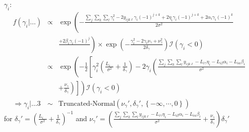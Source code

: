 $\gamma_i$:\\
\begin{eqnarray*}
f(\gamma_i|\dots)&\propto&\exp\left(-\frac{\sum_j\sum_k\sum_l\gamma_i^2-2y_{ijk\ell}\gamma_i(-1)^{j+k}+2\eta_i\gamma_i(-1)^{j+k}+2\alpha_i\gamma_i(-1)^k}{2\sigma^2}\right.\\
&&\left.\frac{+2\beta_i\gamma_i(-1)^j}{}\right)\times\exp\left(-\frac{\gamma_i^2-2\gamma_i\nu_{\gamma}+\nu_{\gamma}^2}{2\delta_{\gamma}}\right)\mathcal{I}\left(\gamma_i<0\right)\\
&\propto&\exp\left(-\frac{1}{2}\left[\gamma_i^{2}\left(\frac{L_{i\cdot\cdot}}{\sigma^2}+\frac{1}{\delta_{\gamma}}\right)-2\gamma_i\left(\frac{\sum_j\sum_k\sum_ly_{ijk\ell}-L_{i\gamma}\eta_i-L_{i\beta}\alpha_i-L_{i\alpha}\beta_i}{\sigma^2}\right.\right.\right.\\
&&\left.\left.\left.+\frac{\nu_{\gamma}}{\delta_{\gamma}}\right)\right]\right)\mathcal{I}\left(\gamma_i<0\right)\\
\Rightarrow\gamma_i|\dots3&\sim&\mbox{Truncated-Normal}\left(\nu_{\gamma}',\delta_{\gamma}',\left\{-\infty,\cdots,0\right\}\right)
\end{eqnarray*}
for $\displaystyle{\delta_{\gamma}' = \left(\frac{L_{i\cdot\cdot}}{\sigma^2}+\frac{1}{\delta_{\gamma}}\right)^{-1}}$ and $\displaystyle{\nu_{\gamma}' = \left(\frac{\sum_j\sum_k\sum_ly_{ijk\ell}-L_{i\gamma}\eta_i-L_{i\beta}\alpha_i-L_{i\alpha}\beta_i}{\sigma^2}+\frac{\nu_{\gamma}}{\delta_{\gamma}}\right)\delta_{\gamma}'}$\\

